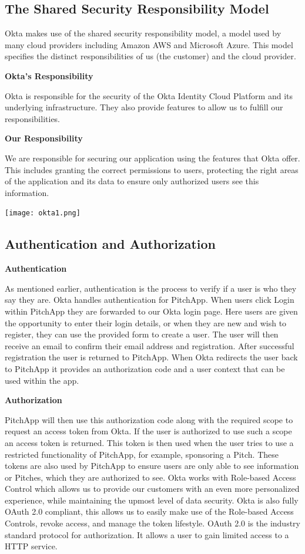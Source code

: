 \subsection{The Shared Security Responsibility Model}

Okta makes use of the shared security responsibility model, a model used by many cloud providers including Amazon AWS and Microsoft Azure. This model specifies the distinct responsibilities of us (the customer) and the cloud provider.

\textbf{Okta's Responsibility}

Okta is responsible for the security of the Okta Identity Cloud Platform and its underlying infrastructure. They also provide features to allow us to fulfill our responsibilities.

\textbf{Our Responsibility}

We are responsible for securing our application using the features that Okta offer. This includes granting the correct permissions to users, protecting the right areas of the application and its data to ensure only authorized users see this information.

\begin{center}
	\texttt{[image: okta1.png]}
\end{center}

\subsection{Authentication and Authorization}

\textbf{Authentication}

As mentioned earlier, authentication is the process to verify if a user is who they say they are. Okta handles authentication for PitchApp. When users click Login within PitchApp they are forwarded to our Okta login page. Here users are given the opportunity to enter their login details, or when they are new and wish to register, they can use the provided form to create a user. The user will then receive an email to confirm their email address and registration. After successful registration the user is returned to PitchApp. When Okta redirects the user back to PitchApp it provides an authorization code and a user context that can be used within the app.

\textbf{Authorization}

PitchApp will then use this authorization code along with the required scope to request an access token from Okta. If the user is authorized to use such a scope an access token is returned. This token is then used when the user tries to use a restricted functionality of PitchApp, for example, sponsoring a Pitch. These tokens are also used by PitchApp to ensure users are only able to see information or Pitches, which they are authorized to see.
Okta works with Role-based Access Control which allows us to provide our customers with an even more personalized experience, while maintaining the upmost level of data security. Okta is also fully OAuth 2.0 compliant, this allows us to easily make use of the Role-based Access Controls, revoke access, and manage the token lifestyle. OAuth 2.0 is the industry standard protocol for authorization. It allows a user to gain limited access to a HTTP service.

